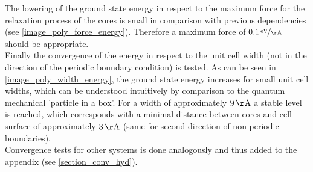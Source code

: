 The lowering of the ground state energy in respect to the maximum force for the relaxation process of the cores is small in comparison with previous dependencies (see \cref{image_poly_force_energy}). Therefore a maximum force of $\unitfrac[0.1]{eV}{\AA}$ should be appropriate.\\
Finally the convergence of the energy in respect to the unit cell width (not in the direction of the periodic boundary condition) is tested. As can be seen in \cref{image_poly_width_energy}, the ground state energy increases for small unit cell widths, which can be understood intuitively by comparison to the quantum mechanical 'particle in a box'. For a width of approximately $\unit[9]{\AA}$ a stable level is reached, which corresponds with a minimal distance between cores and cell surface of approximately $\unit[3]{\AA}$ (same for second direction of non periodic boundaries).\\
Convergence tests for other systems is done analogously and thus added to the appendix (see \cref{section_conv_hyd}).

